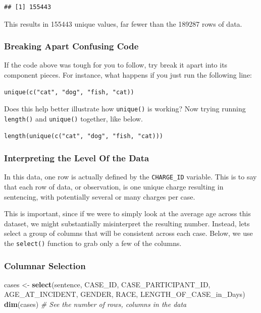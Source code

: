 \documentclass[]{article}
\newenvironment{Shaded}{\begin{snugshade}}{\end{snugshade}}
\newcommand{\KeywordTok}[1]{\textcolor[rgb]{0.13,0.29,0.53}{\textbf{#1}}}
\newcommand{\StringTok}[1]{\textcolor[rgb]{0.31,0.60,0.02}{#1}}
\newcommand{\CommentTok}[1]{\textcolor[rgb]{0.56,0.35,0.01}{\textit{#1}}}
\newcommand{\NormalTok}[1]{#1}
\begin{document}
\begin{verbatim}
## [1] 155443
\end{verbatim}

This results in 155443 unique values, far fewer than the 189287 rows of
data.

\subsubsection{Breaking Apart Confusing
Code}\label{breaking-apart-confusing-code}

If the code above was tough for you to follow, try break it apart into
its component pieces. For instance, what happens if you just run the
following line:

\begin{verbatim}
unique(c("cat", "dog", "fish, "cat))
\end{verbatim}

Does this help better illustrate how \texttt{unique()} is working? Now
trying running \texttt{length()} and \texttt{unique()} together, like
below.

\begin{verbatim}
length(unique(c("cat", "dog", "fish, "cat)))
\end{verbatim}

\subsubsection{Interpreting the Level Of the
Data}\label{interpreting-the-level-of-the-data}

In this data, one row is actually defined by the \texttt{CHARGE\_ID}
variable. This is to say that each row of data, or observation, is one
unique charge resulting in sentencing, with potentially several or many
charges per case.

This is important, since if we were to simply look at the average age
across this dataset, we might substantially misinterpret the resulting
number. Instead, lets select a group of columns that will be consistent
across each case. Below, we use the \texttt{select()} function to grab
only a few of the columns.

\subsubsection{Columnar Selection}\label{columnar-selection}

\begin{Shaded}
\begin{Highlighting}[]
\NormalTok{cases <-}\StringTok{ }\KeywordTok{select}\NormalTok{(sentence, CASE_ID, CASE_PARTICIPANT_ID, AGE_AT_INCIDENT, GENDER, RACE, LENGTH_OF_CASE_in_Days)}
\KeywordTok{dim}\NormalTok{(cases) }\CommentTok{# See the number of rows, columns in the data}
\end{Highlighting}
\end{Shaded}
\end{document}
